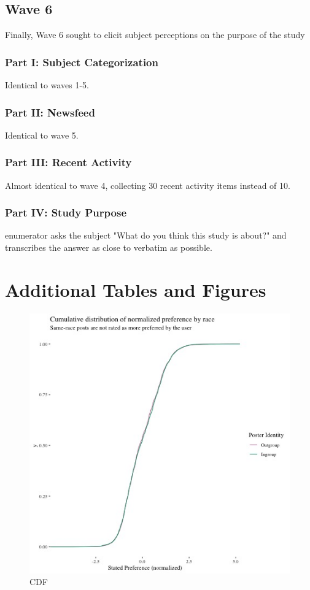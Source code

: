 \documentclass[12pt,letterpaper]{article}
\begin{document}
\subsection{Wave 6}

Finally, Wave 6 sought to elicit subject perceptions on the purpose of the study 

\subsubsection{Part I: Subject Categorization} Identical to waves 1-5.

\subsubsection{Part II: Newsfeed}  Identical to wave 5.

\subsubsection{Part III: Recent Activity} Almost identical to wave 4, collecting 30 recent activity items instead of 10.

\subsubsection{Part IV: Study Purpose} enumerator asks the subject "What do you think this study is about?" and transcribes the answer as close to verbatim as possible.

\section{Additional Tables and Figures}\label{app:tab_fig}

\begin{figure}[!h]
    \centering
    \includegraphics[scale=.8]{Output/Graphs/Audit/Stated preferences/US NF cdf norm preferences by ingroup.jpg}
    \caption{CDF}
    \label{fig:prefcdf}
\end{figure}
\end{document}
